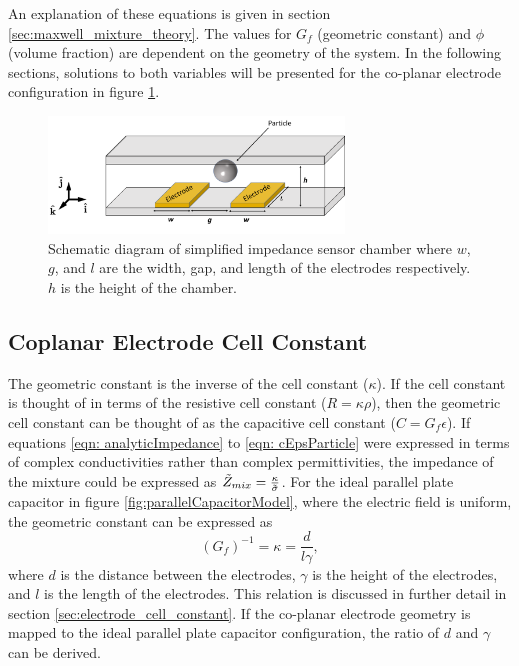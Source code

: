 \par An explanation of these equations is given in section \ref{sec:maxwell_mixture_theory}. The values for $G_f$ (geometric constant) and $\phi$ (volume fraction) are dependent on the geometry of the system. In the following sections, solutions to both variables will be presented for the co-planar electrode configuration in figure \ref{fig:simplified_IS_models}.


 \begin{figure}[ht]
 \centering
 \includegraphics[width=0.7\textwidth]{images/singleCellSuspensionModelWithCoordinateSystem.png}
 \caption[Diagram of the simplified impedance sensor chamber.]{Schematic diagram of simplified impedance sensor chamber where $w$, $g$, and $l$ are the width, gap, and length of the electrodes respectively. $h$ is the height of the chamber.}
 \label{fig:simplified_IS_models}
 \end{figure}


\subsection{Coplanar Electrode Cell Constant}
\label{sec: coplanarElectrodeCellConstant}
    \par The geometric constant is the inverse of the cell constant ($\kappa$). If the cell constant is thought of in terms of the resistive cell constant ($R=\kappa\rho$), then the geometric cell constant can be thought of as the capacitive cell constant ($C=G_f\epsilon$). If equations \ref{eqn: analyticImpedance} to \ref{eqn: cEpsParticle} were expressed in terms of complex conductivities rather than complex permittivities, the impedance of the mixture could be expressed as $\Tilde{Z}_{mix}=\frac{\kappa}{\Tilde{\sigma}}$. For the ideal parallel plate capacitor in figure \ref{fig:parallelCapacitorModel}, where the electric field is uniform, the geometric constant can be expressed as
    \begin{equation}
        (G_f)^{-1} = \kappa = \frac{d}{l\gamma},
        \label{eqn: cellConstants}
    \end{equation}
    \noindent where $d$ is the distance between the electrodes, $\gamma$ is the height of the electrodes, and $l$ is the length of the electrodes. This relation is discussed in further detail in section \ref{sec:electrode_cell_constant}. If the co-planar electrode geometry is mapped to the ideal parallel plate capacitor configuration, the ratio of $d$ and $\gamma$ can be derived. 


